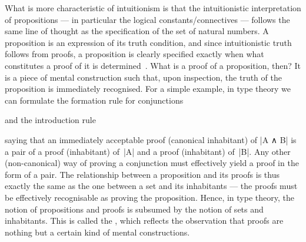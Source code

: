 What is more characteristic of intuitionism is that the intuitionistic interpretation of propositions --- in particular the logical constants/connectives --- follows the same line of thought as the specification of the set of natural numbers.
A proposition is an expression of its truth condition, and since intuitionistic truth follows from proofs, a proposition is clearly specified exactly when what constitutes a proof of it is determined~\citep{ML-truth-of-a-proposition}.
What is a proof of a proposition, then? It is a piece of mental construction such that, upon inspection, the truth of the proposition is immediately recognised.
For a simple example, in type theory we can formulate the formation rule for conjunctions
\begin{center}
 \DP
\end{center}
and the introduction rule
\begin{center}
   \DP
\end{center}
saying that an immediately acceptable proof (canonical inhabitant) of |A ∧ B| is a pair of a proof (inhabitant) of~|A| and a proof (inhabitant) of~|B|.
Any other (non-canonical) way of proving a conjunction must effectively yield a proof in the form of a pair.
The relationship between a proposition and its proofs is thus exactly the same as the one between a set and its inhabitants --- the proofs must be effectively recognisable as proving the proposition.
Hence, in type theory, the notion of propositions and proofs is subsumed by the notion of sets and inhabitants.
This is called the , which reflects the observation that proofs are nothing but a certain kind of mental constructions.

